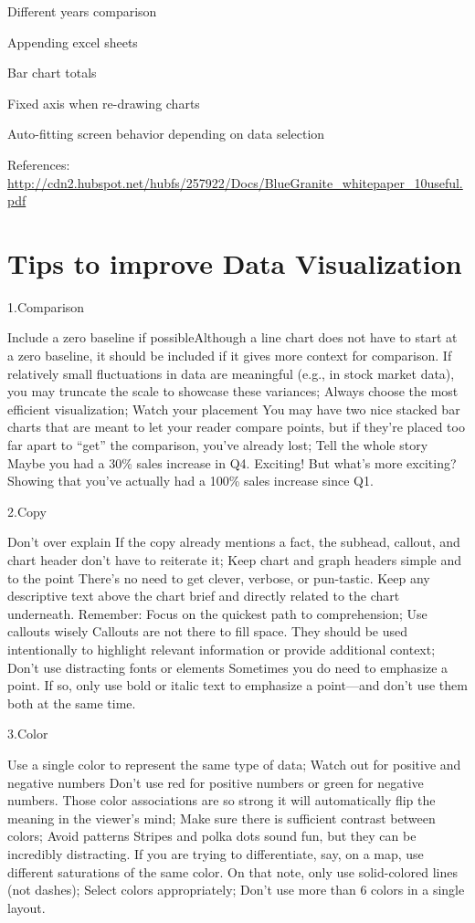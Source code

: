 \documentclass[]{book}
\theoremstyle{definition}
\theoremstyle{definition}
\theoremstyle{definition}
\theoremstyle{remark}
\begin{document}
Different years comparison

Appending excel sheets

Bar chart totals

Fixed axis when re-drawing charts

Auto-fitting screen behavior depending on data selection

References:
\url{http://cdn2.hubspot.net/hubfs/257922/Docs/BlueGranite_whitepaper_10useful.pdf}

\chapter{Tips to improve Data
Visualization}\label{tips-to-improve-data-visualization-1}

1.Comparison

Include a zero baseline if possibleAlthough a line chart does not have
to start at a zero baseline, it should be included if it gives more
context for comparison. If relatively small fluctuations in data are
meaningful (e.g., in stock market data), you may truncate the scale to
showcase these variances; Always choose the most efficient
visualization; Watch your placement You may have two nice stacked bar
charts that are meant to let your reader compare points, but if they're
placed too far apart to ``get'' the comparison, you've already lost;
Tell the whole story Maybe you had a 30\% sales increase in Q4.
Exciting! But what's more exciting? Showing that you've actually had a
100\% sales increase since Q1.

2.Copy

Don't over explain If the copy already mentions a fact, the subhead,
callout, and chart header don't have to reiterate it; Keep chart and
graph headers simple and to the point There's no need to get clever,
verbose, or pun-tastic. Keep any descriptive text above the chart brief
and directly related to the chart underneath. Remember: Focus on the
quickest path to comprehension; Use callouts wisely Callouts are not
there to fill space. They should be used intentionally to highlight
relevant information or provide additional context; Don't use
distracting fonts or elements Sometimes you do need to emphasize a
point. If so, only use bold or italic text to emphasize a point---and
don't use them both at the same time.

3.Color

Use a single color to represent the same type of data; Watch out for
positive and negative numbers Don't use red for positive numbers or
green for negative numbers. Those color associations are so strong it
will automatically flip the meaning in the viewer's mind; Make sure
there is sufficient contrast between colors; Avoid patterns Stripes and
polka dots sound fun, but they can be incredibly distracting. If you are
trying to differentiate, say, on a map, use different saturations of the
same color. On that note, only use solid-colored lines (not dashes);
Select colors appropriately; Don't use more than 6 colors in a single
layout.
\end{document}
